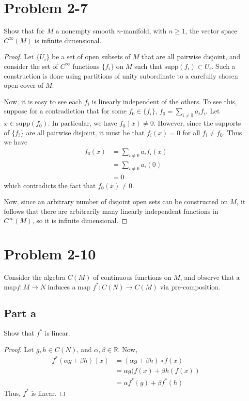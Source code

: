 \documentclass[fontsize=11pt]{scrartcl} %
\numberwithin{equation}{section} %
\numberwithin{figure}{section} %
\numberwithin{table}{section} %
\newcommand{\R}{\mathbb{R}}
\newcommand{\supp}{\textrm{supp}}
\begin{document}
\section*{Problem 2-7}
Show that for $M$ a nonempty smooth $n$-manifold, with $n\geq 1$, the vector space $C^{\infty}(M)$
is infinite dimensional.
\\
\begin{proof}
Let $\{U_i\}$ be a set of open subsets of $M$ that are all pairwise disjoint, and consider
the set of $C^{\infty}$ functions $\{f_i\}$ on $M$ such that $\supp(f_i)\subset U_i$.
Such a construction is done using partitions of unity subordinate to a carefully chosen
open cover of $M$.

Now, it is easy to see each $f_i$ is linearly independent of the others. To see this,
suppose for a contradiction that for some $f_0\in\{f_i\}$, $f_0 = \sum_{i\neq 0} a_if_i$.
Let $x\in\supp(f_0)$. In particular, we have $f_0(x)\neq 0$. However, since the supports
of $\{f_i\}$ are all pairwise disjoint, it must be that $f_i(x)=0$ for all $f_i\neq f_0$.
Thus we have
\[
\begin{aligned}
f_0(x)  &= \sum_{i\neq 0}a_if_i(x)\\
        &= \sum_{i\neq 0}a_i (0)\\
        &= 0
\end{aligned}
\]
which contradicts the fact that $f_0(x)\neq 0$.

Now, since an arbitrary number of disjoint open sets can be constructed on $M$, it follows
that there are arbitrarily many linearly independent functions in $C^{\infty}(M)$,
so it is infinite dimensional.
\end{proof}
\pagebreak
\section*{Problem 2-10}
Consider the algebra $C(M)$ of continuous functions on $M$, and observe that a map$f:M\to N$
induces a map $f^*:C(N)\to C(M)$ via pre-composition.
\subsection*{Part a}
Show that $f^*$ is linear.
\\
\begin{proof}
Let $g,h\in C(N)$, and $\alpha,\beta\in\R$. Now,
\[
\begin{aligned}
f^*(\alpha g+\beta h)(x)    &= (\alpha g + \beta h)\circ f(x)\\
                            &= \alpha g(f(x) + \beta h(f(x))\\
                            &= \alpha f^*(g) + \beta f^*(h)
\end{aligned}
\]
Thus, $f^*$ is linear.
\end{proof}
\end{document}
